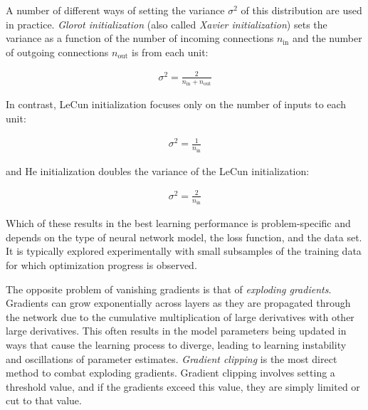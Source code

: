 \begin{itemize}
A number of different ways of setting the variance $\sigma^2$ of this distribution are used in practice. \emph{Glorot initialization} (also called \emph{Xavier initialization}) sets the variance as a function of the number of incoming connections $n_{\text{in}}$ and the number of outgoing connections $n_{\text{out}}$ is from each unit:

\begin{align*}
  \sigma^2 = \frac{2}{n_{\text{in}} + n_{\text{out}}}
\end{align*}

\noindent In contrast, LeCun initialization focuses only on the number of inputs to each unit:

\begin{align*}
  \sigma^2 = \frac{1}{n_{\text{in}}}
\end{align*}

\noindent and He initialization doubles the variance of the LeCun initialization:

\begin{align*}
  \sigma^2 = \frac{2}{n_{\text{in}}}
\end{align*}

\end{itemize}

Which of these results in the best learning performance is problem-specific and depends on the type of neural network model, the loss function, and the data set. It is typically explored experimentally with small subsamples of the training data for which optimization progress is observed.

The opposite problem of vanishing gradients is that of \emph{exploding gradients}. Gradients can grow exponentially across layers as they are propagated through the network due to the cumulative multiplication of large derivatives with other large derivatives. This often results in the model parameters being updated in ways that cause the learning process to diverge, leading to learning instability and oscillations of parameter estimates. \emph{Gradient clipping} is the most direct method to combat exploding gradients. Gradient clipping involves setting a threshold value, and if the gradients exceed this value, they are simply limited or cut to that value.


